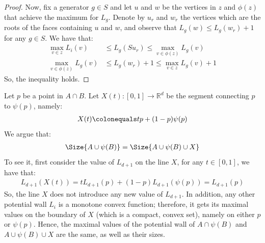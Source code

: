 \begin{proof}
Now, fix a generator $g \in S$ and let $u$ and $w$ be the vertices in $z$ and $\phi(z)$ that achieve the maximum for $L_{g}$. Denote by $u_{r}$ and $w_{r}$ the vertices which are the roots of the faces containing $u$ and $w$, and observe that $L_{g}(w) \le L_{g}(w_{r})+1$ for any $g \in S$. We have that:
    \begin{equation*}
      \begin{split}
        \max_{v \in z} L_{i}(v) &  \le   L_{g}(S u_{r}) \le  \max_{v \in \phi(z)} L_{g}(v)  \\
        \max_{v \in \phi(z)} L_{g}(v) & \le  L_{g}(w_{r})  + 1 \le  \max_{v \in z} L_{g}(v) + 1 
      \end{split}
    \end{equation*}
So, the inequality holds.
\end{proof}





  Let $p$ be a point in $A \cap B$. Let $X(t): [0,1] \rightarrow \mathbb{R}^{d}$ be the segment connecting $p$ to $\psi(p)$, namely:
\begin{equation*}
  \begin{split}
    X(t) \colonequals t p + (1-p) \psi (p)
  \end{split}
\end{equation*}
We argue that:
\begin{equation*}
  \begin{split}
    \Size{ A \cup \psi(B)} = \Size{ A \cup \psi(B) \cup X } 
  \end{split}
\end{equation*}
To see it, first consider the value of $L_{d+1}$ on the line $X$, for any $t \in [0,1]$, we have that: 
\begin{equation*}
  \begin{split}
  L_{d+1} (X(t)) = t L_{d+1}(p) + (1-p) L_{d+1}(\psi (p)) = L_{d+1}(p)
  \end{split}
\end{equation*}
So, the line $X$ does not introduce any new value of $L_{d+1}$. In addition, any other potential wall $L_{i}$ is a monotone convex function; therefore, it gets its maximal values on the boundary of $X$ (which is a compact, convex set), namely on either $p$ or $\psi(p)$. Hence, the maximal values of the potential wall of $A\cap \psi(B)$ and $A \cup \psi(B) \cup X$ are the same, as well as their sizes.

